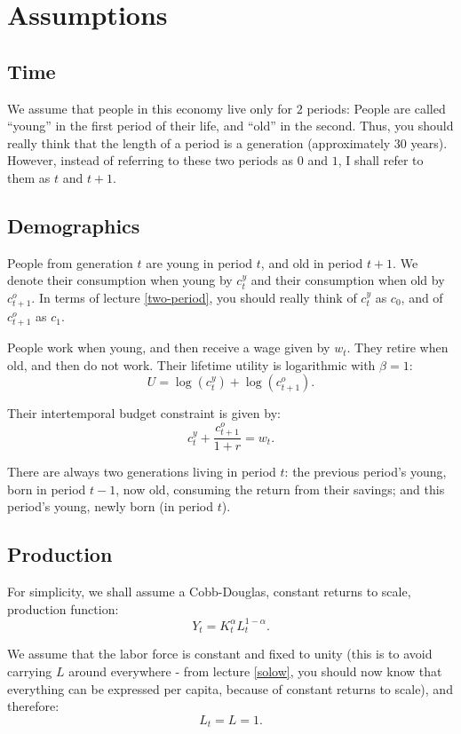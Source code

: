 \documentclass[]{book}
\begin{document}
\section{Assumptions}\label{assumptions-1}

\subsection{Time}\label{time}

We assume that people in this economy live only for \(2\) periods:
People are called ``young'' in the first period of their life, and
``old'' in the second. Thus, you should really think that the length of
a period is a generation (approximately 30 years). However, instead of
referring to these two periods as \(0\) and \(1\), I shall refer to them
as \(t\) and \(t+1\).

\subsection{Demographics}\label{demographics}

People from generation \(t\) are young in period \(t\), and old in
period \(t+1\). We denote their consumption when young by \(c_{t}^{y}\)
and their consumption when old by \(c_{t+1}^{o}\). In terms of lecture
\ref{two-period}, you should really think of \(c_{t}^{y}\) as \(c_{0}\),
and of \(c_{t+1}^{o}\) as \(c_{1}\).

People work when young, and then receive a wage given by \(w_{t}\). They
retire when old, and then do not work. Their lifetime utility is
logarithmic with \(\beta=1\): \[U=\log(c_{t}^{y})+\log(c_{t+1}^{o}).\]

Their intertemporal budget constraint is given by:
\[c_{t}^{y}+\frac{c_{t+1}^{o}}{1+r}=w_{t}.\]

There are always two generations living in period \(t\): the previous
period's young, born in period \(t-1\), now old, consuming the return
from their savings; and this period's young, newly born (in period
\(t\)).

\subsection{Production}\label{production}

For simplicity, we shall assume a Cobb-Douglas, constant returns to
scale, production function: \[Y_{t}=K_{t}^{\alpha}L_{t}^{1-\alpha}.\]

We assume that the labor force is constant and fixed to unity (this is
to avoid carrying \(L\) around everywhere - from lecture \ref{solow},
you should now know that everything can be expressed per capita, because
of constant returns to scale), and therefore: \[L_{t}=L=1.\]
\end{document}
